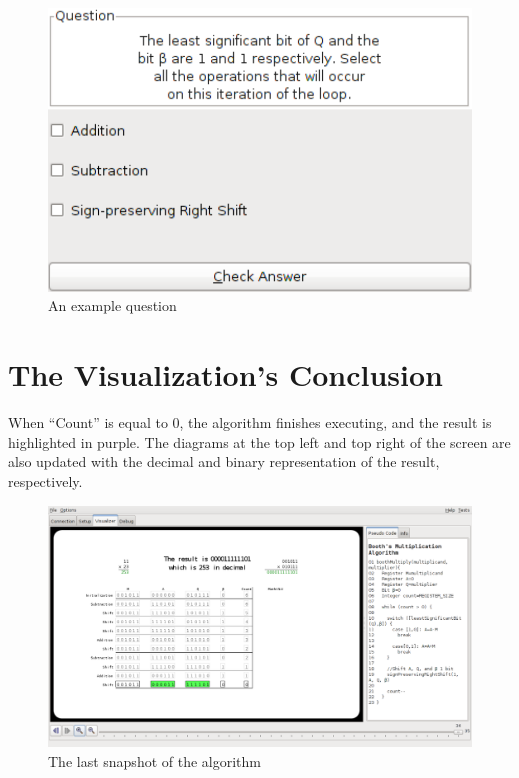 \documentclass{article}
\begin{document}
\begin{figure}[h]
\centering
\includegraphics[scale=0.3]{que.pdf}
\caption{An example question}
\end{figure}

\pagebreak

\section{The Visualization's Conclusion}
When ``Count'' is equal to 0, the algorithm finishes executing, and the result is highlighted in purple.
The diagrams at the top left and top right of the screen are also updated with the decimal and binary representation of the result, respectively.

\begin{figure}[h]
\centering
\includegraphics[scale=0.3]{finish.pdf}
\caption{The last snapshot of the algorithm}
\end{figure}
\end{document}
